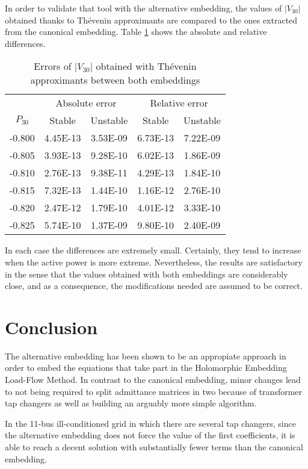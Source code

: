 \documentclass[conference]{IEEEtran}
\begin{document}
In order to validate that tool with the alternative embedding, the values of $|V_{30}|$ obtained thanks to Thévenin approximants are compared to the ones extracted from the canonical embedding. Table \ref{tab:2} shows the absolute and relative differences.
\begin{table}[!ht]
\renewcommand{\arraystretch}{1.3}
\caption{Errors of $|V_{30}|$ obtained with Thévenin approximants between both embeddings}
\label{tab:2}
\centering
\begin{tabular}{ccccc}
\hline
& \multicolumn{2}{c}{Absolute error}& \multicolumn{2}{c}{Relative error}\\
\cline{2-5}
$P_{30}$ & Stable & Unstable & Stable & Unstable\\
\hline
-0.800 & 4.45E-13 & 3.53E-09 & 6.73E-13 & 7.22E-09 \\
-0.805 & 3.93E-13 & 9.28E-10 & 6.02E-13 & 1.86E-09 \\
-0.810 & 2.76E-13 & 9.38E-11 & 4.29E-13 & 1.84E-10 \\
-0.815 & 7.32E-13 & 1.44E-10 & 1.16E-12 & 2.76E-10 \\
-0.820 & 2.47E-12 & 1.79E-10 & 4.01E-12 & 3.33E-10 \\
-0.825 & 5.74E-10 & 1.37E-09 & 9.80E-10 & 2.40E-09 \\
\hline
\end{tabular}
\end{table}

In each case the differences are extremely small. Certainly, they tend to increase when the active power is more extreme. Nevertheless, the results are satisfactory in the sense that the values obtained with both embeddings are considerably close, and as a consequence, the modifications needed are assumed to be correct.

\section{Conclusion} \label{sec5}
The alternative embedding has been shown to be an appropiate approach in order to embed the equations that take part in the Holomorphic Embedding Load-Flow Method. In contrast to the canonical embedding, minor changes lead to not being required to split admittance matrices in two because of transformer tap changers as well as building an arguably more simple algorithm. 

In the 11-bus ill-conditioned grid in which there are several tap changers, since the alternative embedding does not force the value of the first coefficients, it is able to reach a decent solution with substantially fewer terms than the canonical embedding.
\end{document}
